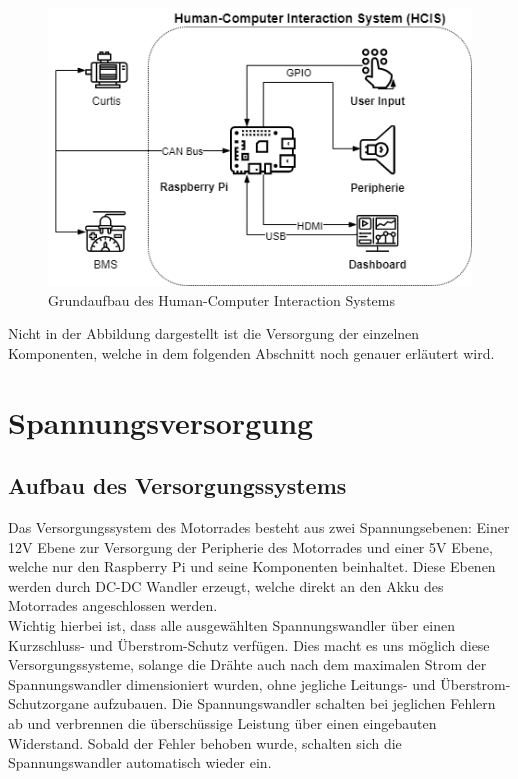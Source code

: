 \begin{figure}[H]
	\begin{center}
		\includegraphics[scale=0.5]{figures/hcis/HCIS_Grundfunktion.png}
		\caption{Grundaufbau des Human-Computer Interaction Systems}
		\label{fig:aufbauHCIS}
	\end{center}
\end{figure}

Nicht in der Abbildung dargestellt ist die Versorgung der einzelnen Komponenten, welche in dem folgenden Abschnitt noch genauer erläutert wird.

\newpage



\section{Spannungsversorgung}

\subsection{Aufbau des Versorgungssystems} \label{sec:aufbauversorgung}

Das Versorgungssystem des Motorrades besteht aus zwei Spannungsebenen: Einer 12V Ebene zur Versorgung der Peripherie des Motorrades und einer 5V Ebene, welche nur den Raspberry Pi und seine Komponenten beinhaltet. Diese Ebenen werden durch DC-DC Wandler erzeugt, welche direkt an den Akku des Motorrades angeschlossen werden. \\

Wichtig hierbei ist, dass alle ausgewählten Spannungswandler über einen Kurzschluss- und Überstrom-Schutz verfügen. Dies macht es uns möglich diese Versorgungssysteme, solange die Drähte auch nach dem maximalen Strom der Spannungswandler dimensioniert wurden, ohne jegliche Leitungs- und Überstrom-Schutzorgane aufzubauen. Die Spannungswandler schalten bei jeglichen Fehlern ab und verbrennen die überschüssige Leistung über einen eingebauten Widerstand. Sobald der Fehler behoben wurde, schalten sich die Spannungswandler automatisch wieder ein.

